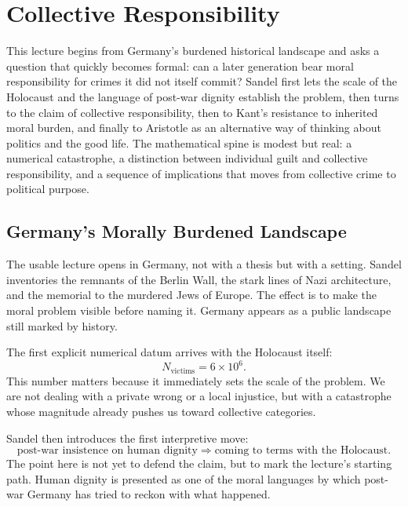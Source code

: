 \chapter{Collective Responsibility}

This lecture begins from Germany's burdened historical landscape and asks a question that quickly becomes formal: can a later generation bear moral responsibility for crimes it did not itself commit? Sandel first lets the scale of the Holocaust and the language of post-war dignity establish the problem, then turns to the claim of collective responsibility, then to Kant's resistance to inherited moral burden, and finally to Aristotle as an alternative way of thinking about politics and the good life. The mathematical spine is modest but real: a numerical catastrophe, a distinction between individual guilt and collective responsibility, and a sequence of implications that moves from collective crime to political purpose.

\section{Germany's Morally Burdened Landscape}

The usable lecture opens in Germany, not with a thesis but with a setting. Sandel inventories the remnants of the Berlin Wall, the stark lines of Nazi architecture, and the memorial to the murdered Jews of Europe. The effect is to make the moral problem visible before naming it. Germany appears as a public landscape still marked by history.

The first explicit numerical datum arrives with the Holocaust itself:
\begin{equation}
N_{\text{victims}} = 6 \times 10^6.
\end{equation}
This number matters because it immediately sets the scale of the problem. We are not dealing with a private wrong or a local injustice, but with a catastrophe whose magnitude already pushes us toward collective categories.

Sandel then introduces the first interpretive move:
\begin{equation}
\text{post-war insistence on human dignity}
\Longrightarrow
\text{coming to terms with the Holocaust}.
\end{equation}
The point here is not yet to defend the claim, but to mark the lecture's starting path. Human dignity is presented as one of the moral languages by which post-war Germany has tried to reckon with what happened.


